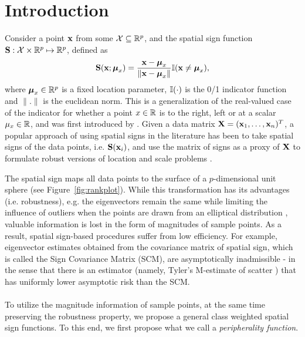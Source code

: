 \section{Introduction}
\label{Section:SP}
 
Consider a point ${\bf{x}}$ from some $\mathcal{X} \subseteq {\mathbb{R}}^p$, and the spatial sign function ${\mathbf{S}} : \mathcal{X} \times {\mathbb{R}}^p \mapsto {\mathbb{R}}^p$, defined as
%
$$
{\mathbf{S}} ({\bf{x}}; {\boldsymbol{\mu}}_x) = \frac{{\bf{x}} - {\boldsymbol{\mu}}_x}{\| {\bf{x}} - {\boldsymbol{\mu}}_x \|}
{\mathbb{I}} ( {\bf{x}} \ne {\boldsymbol{\mu}}_x ),
$$
%
where ${\boldsymbol{\mu}}_x \in {\mathbb{R}}^p$ is a fixed location parameter, ${\mathbb{I}}(\cdot)$ is the 0/1 indicator function and $\|.\|$ is the euclidean norm. This is a generalization of the real-valued case of the indicator for whether a point $x \in {\mathbb{R}}$ is to the right, left or at a scalar $\mu_{x} \in {\mathbb{R}}$, and was first introduced by \cite{MottonenOja95}. Given a data matrix ${\mathbf{X}} = ({\bf{x}}_{1}, \ldots, {\bf{x}}_{n})^T$, a popular approach of using spatial signs in the literature has been to take spatial signs of the data points, i.e. ${\mathbf{S}}({\bf{x}}_i)$, and use the matrix of signs as a proxy of ${\mathbf{X}}$ to formulate robust versions of location and scale problems  \citep{locantore99, OjaBook10,WangPengLi15}.

The spatial sign maps all data points to the surface of a $p$-dimensional unit sphere (see Figure~\ref{fig:rankplot}). While this transformation has its advantages (i.e. robustness), e.g. the eigenvectors remain the same while limiting the influence of outliers when the points are drawn from an elliptical distribution \citep{taskinen12}, valuable information is lost in the form of magnitudes of sample points. As a result, spatial sign-based procedures suffer from low efficiency. For example, eigenvector estimates obtained from the covariance matrix of spatial sign, which is called the Sign Covariance Matrix (SCM), are asymptotically inadmissible \citep{magyar14}- in the sense that there is an estimator (namely, Tyler's M-estimate of scatter \citep{tyler87}) that has uniformly lower asymptotic risk than the SCM.

\paragraph{}
To utilize the magnitude information of sample points, at the same time preserving the robustness property, we propose a general class weighted spatial sign functions. To this end, we first propose what we call a {\it peripherality function}.

